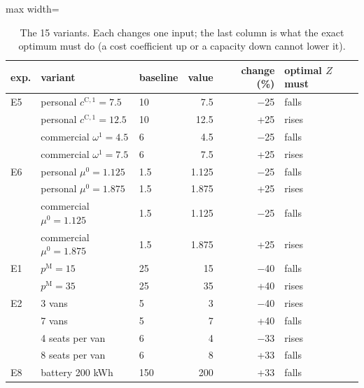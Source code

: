 \begin{table}[H]\centering
\small
\caption{The 15 variants. Each changes one input; the last column is what the exact optimum must do (a cost coefficient up or a capacity down cannot lower it).}\label{tab:variants}
\begin{adjustbox}{max width=\textwidth}\begin{tabular}{lllrrl}\toprule
exp. & variant & baseline & value & change (\%) & optimal $Z$ must \\ \midrule
E5 & personal $c^{\mathrm C,1}=7.5$ & 10 & 7.5 & $-$25 & falls \\
 & personal $c^{\mathrm C,1}=12.5$ & 10 & 12.5 & +25 & rises \\
 & commercial $\omega^{1}=4.5$ & 6 & 4.5 & $-$25 & falls \\
 & commercial $\omega^{1}=7.5$ & 6 & 7.5 & +25 & rises \\
E6 & personal $\mu^{0}=1.125$ & 1.5 & 1.125 & $-$25 & falls \\
 & personal $\mu^{0}=1.875$ & 1.5 & 1.875 & +25 & rises \\
 & commercial $\mu^{0}=1.125$ & 1.5 & 1.125 & $-$25 & falls \\
 & commercial $\mu^{0}=1.875$ & 1.5 & 1.875 & +25 & rises \\
E1 & $p^{\mathrm M}=15$ & 25 & 15 & $-$40 & falls \\
 & $p^{\mathrm M}=35$ & 25 & 35 & +40 & rises \\
E2 & 3 vans & 5 & 3 & $-$40 & rises \\
 & 7 vans & 5 & 7 & +40 & falls \\
 & 4 seats per van & 6 & 4 & $-$33 & rises \\
 & 8 seats per van & 6 & 8 & +33 & falls \\
E8 & battery 200 kWh & 150 & 200 & +33 & falls \\
\bottomrule\end{tabular}\end{adjustbox}\end{table}
